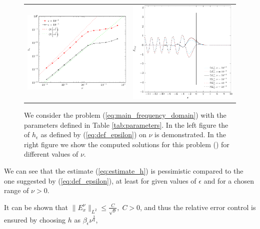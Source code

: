 \begin{figure}
\begin{tabular}{cc}
\includegraphics[height=0.32\textwidth]{pics_frequency_domain/h_nu.pdf}
&
\includegraphics[height=0.32\textwidth]{pics_frequency_domain/res_sol.pdf}
\end{tabular}
\caption{We consider the problem (\ref{eq:main_frequency_domain}) with the parameters 
defined in Table \ref{tab:parameters}. In the left figure the  of $h_{\epsilon}$ as defined by (\ref{eq:def_epsilon}) on $\nu$ is demonstrated.  
In the right figure we show the computed solutions for this problem () for different values of $\nu$. }
\label{fig:dependence}
\end{figure}
We can see that the estimate (\ref{eq:estimate_h}) is pessimistic compared to the one suggested by (\ref{eq:def_epsilon}), 
at least for given values of $\epsilon$ and for a chosen range of $\nu>0$.
\begin{remark}
It can be shown that $\|E^{\nu}_{x}\|_{L^2}\leq \frac{C}{\sqrt{\nu}},\; C>0$, 
and thus the relative error control
\bealn
 \leq \epsilon
\eealn
 is ensured by choosing $h$ as $\beta_{\epsilon}\nu^{\frac{3}{4}}$, 
\end{remark}

